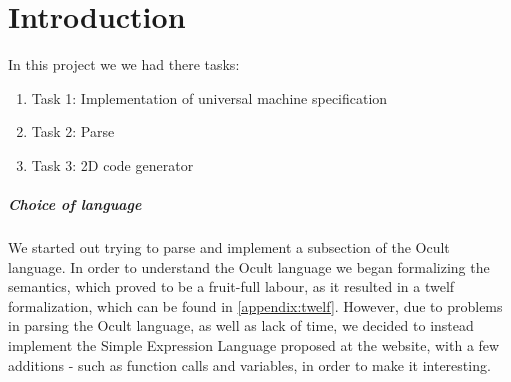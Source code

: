 \chapter*{Introduction}

In this project we we had there tasks:
\begin{enumerate}
\item Task 1: Implementation of universal machine specification
\item Task 2: Parse
\item Task 3: 2D code generator 
\end{enumerate}

\paragraph{Choice of language}
We started out trying to parse and implement a subsection of the Ocult
language. In order to understand the Ocult language we began
formalizing the semantics, which proved to be a fruit-full labour, as
it resulted in a twelf formalization, which can be found in
\ref{appendix:twelf}. However, due to problems in parsing the Ocult
language, as well as lack of time, we decided to instead implement the
Simple Expression Language proposed at the website, with a few
additions - such as function calls and variables, in order to make it interesting.

